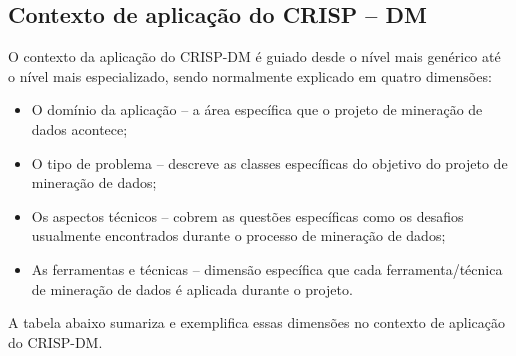 \subsection{Contexto de aplicação do CRISP -- DM}

O contexto da aplicação do CRISP-DM \cite{Crisp2000} é guiado desde o nível mais genérico até o nível mais 
especializado, sendo normalmente explicado em quatro dimensões:

\begin{itemize}
 \item O domínio da aplicação -- a área específica que o projeto de mineração de dados acontece;
 \item O tipo de problema -- descreve as classes específicas do objetivo do projeto de mineração de dados;
 \item Os aspectos técnicos -- cobrem as questões específicas como os desafios usualmente encontrados durante o processo de mineração de dados; 
 \item As ferramentas e técnicas -- dimensão específica que cada ferramenta/técnica de mineração de dados é aplicada durante o projeto.
\end{itemize}

A tabela abaixo sumariza e exemplifica essas dimensões no contexto de aplicação do CRISP-DM.

